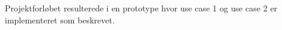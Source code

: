 

\noindent Projektforløbet resulterede i en prototype hvor use case 1 og use case 2 er implementeret som beskrevet.


